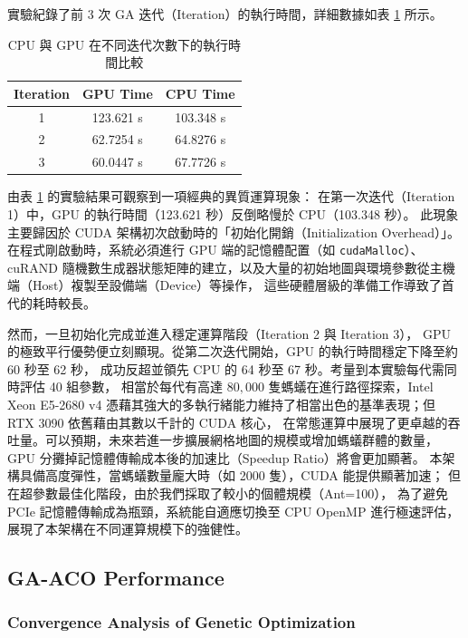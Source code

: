 \documentclass[conference]{IEEEtran}
\begin{document}
實驗紀錄了前 3 次 GA 迭代（Iteration）的執行時間，詳細數據如表 \ref{tab:cuda_perf} 所示。

\begin{table}[!t]
    \centering
    \caption{CPU 與 GPU 在不同迭代次數下的執行時間比較}
    \label{tab:cuda_perf}
    \renewcommand{\arraystretch}{1.2}
    \begin{tabular}{|c|c|c|}
        \hline
        \textbf{Iteration} & \textbf{GPU Time} & \textbf{CPU Time} \\ \hline
        1 & 123.621 s & 103.348 s \\ \hline
        2 & 62.7254 s & 64.8276 s \\ \hline
        3 & 60.0447 s & 67.7726 s \\ \hline
    \end{tabular}
\end{table}

由表 \ref{tab:cuda_perf} 的實驗結果可觀察到一項經典的異質運算現象：
在第一次迭代（Iteration 1）中，GPU 的執行時間（123.621 秒）反倒略慢於 CPU（103.348 秒）。
此現象主要歸因於 CUDA 架構初次啟動時的「初始化開銷（Initialization Overhead）」。
在程式剛啟動時，系統必須進行 GPU 端的記憶體配置（如 \texttt{cudaMalloc}）、cuRAND 
隨機數生成器狀態矩陣的建立，以及大量的初始地圖與環境參數從主機端（Host）複製至設備端（Device）等操作，
這些硬體層級的準備工作導致了首代的耗時較長。

然而，一旦初始化完成並進入穩定運算階段（Iteration 2 與 Iteration 3），
GPU 的極致平行優勢便立刻顯現。從第二次迭代開始，GPU 的執行時間穩定下降至約 60 秒至 62 秒，
成功反超並領先 CPU 的 64 秒至 67 秒。考量到本實驗每代需同時評估 40 組參數，
相當於每代有高達 $80,000$ 隻螞蟻在進行路徑探索，Intel Xeon E5-2680 v4
 憑藉其強大的多執行緒能力維持了相當出色的基準表現；但 RTX 3090 依舊藉由其數以千計的 CUDA 核心，
 在常態運算中展現了更卓越的吞吐量。可以預期，未來若進一步擴展網格地圖的規模或增加螞蟻群體的數量，
 GPU 分攤掉記憶體傳輸成本後的加速比（Speedup Ratio）將會更加顯著。
 本架構具備高度彈性，當螞蟻數量龐大時（如 2000 隻），CUDA 能提供顯著加速；
 但在超參數最佳化階段，由於我們採取了較小的個體規模（Ant=100），
 為了避免 PCIe 記憶體傳輸成為瓶頸，系統能自適應切換至 CPU OpenMP 進行極速評估，
 展現了本架構在不同運算規模下的強健性。

\subsection{GA-ACO Performance}

\subsubsection{Convergence Analysis of Genetic Optimization}
\end{document}
